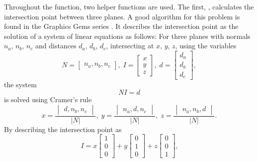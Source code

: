 Throughout the  function, two helper functions are used.
The first, , calculates the intersection point between three planes.
A good algorithm for this problem is found in the Graphics Gems series \cite[p304]{graphics_gems_1}.
It describes the intersection point as the solution of a system of linear equations as follows:
For three planes with normals $n_a$, $n_b$, $n_c$ and distances $d_a$, $d_b$, $d_c$, intersecting at $x$, $y$, $z$, using the variables
\begin{equation}
	N = \begin{bmatrix} n_a, n_b, n_c \end{bmatrix}, \;
	I = \begin{bmatrix} x \\ y \\ z \end{bmatrix}, \;
	d = \begin{bmatrix} d_a \\ d_b \\ d_c \end{bmatrix},
\end{equation}
the system
\begin{equation}
N I = d
\end{equation}
is solved using Cramer's rule
\begin{equation}
	x = \frac{\begin{vmatrix} d, n_b, n_c \end{vmatrix}}{|N|}, \;
	y = \frac{\begin{vmatrix} n_a, d, n_c \end{vmatrix}}{|N|}, \;
	z = \frac{\begin{vmatrix} n_a, n_b, d \end{vmatrix}}{|N|} \text{.}
\end{equation}
By describing the intersection point as
\begin{equation}
	I =
	x \begin{bmatrix} 1 \\ 0 \\ 0 \end{bmatrix} +
	y \begin{bmatrix} 0 \\ 1 \\ 0 \end{bmatrix} +
	z \begin{bmatrix} 0 \\ 0 \\ 1 \end{bmatrix} \text{,}
\end{equation}
